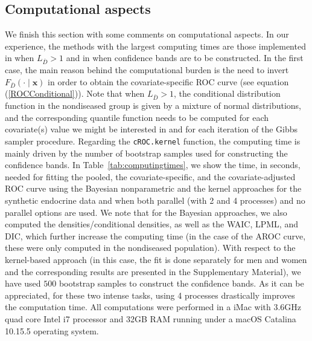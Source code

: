 \subsection{Computational aspects}\label{sec:comp_times}
We finish this section with some comments on computational aspects. In our experience, the methods with the largest computing times are those implemented in  when $L_{\bar{D}} > 1$ and in  when confidence bands are to be constructed. In the first case, the main reason behind the computational burden is the need to invert $F_{\bar{D}}\left(\cdot \mid \mathbf{x}\right)$ in order to obtain the covariate-specific ROC curve (see equation (\ref{ROCConditional})). Note that when $L_{\bar{D}}>1$, the  conditional distribution function in the nondiseased group is given by a mixture of normal distributions, and the corresponding quantile function needs to be computed for each covariate(s) value we might be interested in and for each iteration of the Gibbs sampler procedure. Regarding the \texttt{cROC.kernel} function, the computing time is mainly driven by the number of bootstrap samples used for constructing the confidence bands. In Table~\ref{tab:computingtimes}, we show the time, in seconds, needed for fitting the pooled, the covariate-specific, and the covariate-adjusted ROC curve using the Bayesian nonparametric and the kernel approaches for the synthetic endocrine data and when both parallel (with 2 and 4 processes) and no parallel options are used. We note that for the Bayesian approaches, we also computed the densities/conditional densities, as well as the WAIC, LPML, and DIC, which further increase the computing time (in the case of the AROC curve, these were only computed in the nondiseased population). With respect to the kernel-based approach (in this case, the fit is done separately for men and women and the corresponding results are presented in the Supplementary Material), we have used $500$ bootstrap samples to construct the confidence bands. As it can be appreciated, for these two intense tasks, using 4 processes drastically improves the computation time. All computations were performed in a iMac with 3.6GHz quad core Intel i7 processor and 32GB RAM running under a macOS Catalina 10.15.5 operating system.

